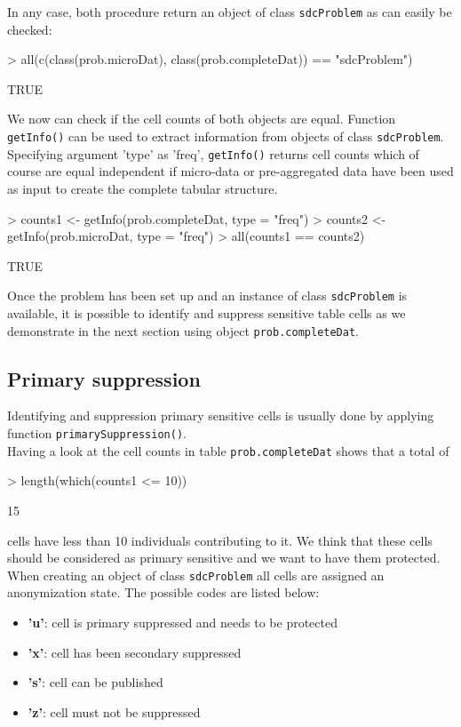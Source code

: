 \documentclass{article}
\begin{document}
In any case, both procedure return an object of class {\tt sdcProblem} as can
easily be checked:
\begin{Schunk}
\begin{Sinput}
> all(c(class(prob.microDat), class(prob.completeDat)) == "sdcProblem")
\end{Sinput}
\begin{Soutput}
[1] TRUE
\end{Soutput}
\end{Schunk}

We now can check if the cell counts of both objects are equal. Function 
{\tt getInfo()} can be used to extract information from objects of class 
{\tt sdcProblem}. Specifying argument 'type' as 'freq', {\tt getInfo()} returns 
cell counts which of course are equal independent if micro-data or pre-aggregated
data have been used as input to create the complete tabular structure.
\begin{Schunk}
\begin{Sinput}
> counts1 <- getInfo(prob.completeDat, type = "freq")
> counts2 <- getInfo(prob.microDat, type = "freq")
> all(counts1 == counts2)
\end{Sinput}
\begin{Soutput}
[1] TRUE
\end{Soutput}
\end{Schunk}

Once the problem has been set up and an instance of class {\tt sdcProblem} is 
available, it is possible to identify and suppress sensitive table cells as
we demonstrate in the next section using object {\tt prob.completeDat}. 

\subsection{Primary suppression}\label{ex1:primSupp}
Identifying and suppression primary sensitive cells is usually done by applying
function {\tt primarySuppression()}.  \\

Having a look at the cell counts in table {\tt prob.completeDat} shows that a 
total of
\begin{Schunk}
\begin{Sinput}
> length(which(counts1 <= 10))
\end{Sinput}
\begin{Soutput}
[1] 15
\end{Soutput}
\end{Schunk}
cells have less than 10 individuals contributing to it. We think that these
cells should be considered as primary sensitive and we want to have them protected.
When creating an object of class {\tt sdcProblem} all cells are assigned an
anonymization state. The possible codes are listed below:
\begin{itemize}
	\item {\bf 'u'}: cell is primary suppressed and needs to be protected
	\item {\bf 'x'}: cell has been secondary suppressed
	\item {\bf 's'}: cell can be published
	\item {\bf 'z'}: cell must not be suppressed 
\end{itemize}
\end{document}
